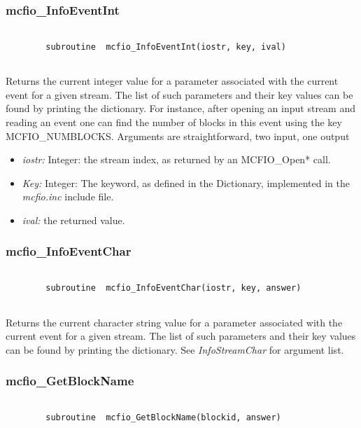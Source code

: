 \subsubsection{mcfio\_InfoEventInt}

\begin{verbatim}

        subroutine  mcfio_InfoEventInt(iostr, key, ival)
    
\end{verbatim}

Returns the current integer value for a parameter associated with the current
event for a given  stream. The list of such parameters and their key values 
can be found by printing the dictionary. For instance, after opening an input
stream and reading an event one can find the number of blocks in this 
 event  using the key
MCFIO\_NUMBLOCKS. Arguments are straightforward, two input, one output

\begin{itemize}
\item {\em iostr:} Integer: the stream index, as returned by an MCFIO\_Open* 
call.
\item {\em Key:} Integer: The keyword, as defined in the Dictionary, 
implemented in the {\em mcfio.inc} include file. 
\item {\em ival:} the  returned value.
\end{itemize}

 
\subsubsection{mcfio\_InfoEventChar}

\begin{verbatim}

        subroutine  mcfio_InfoEventChar(iostr, key, answer)
    
\end{verbatim}

Returns the current character string value for a parameter 
associated with the current event for a 
given stream. The list of such parameters and their key values 
can be found by printing the dictionary. See {\em InfoStreamChar} for
argument list. 

	
\subsubsection{mcfio\_GetBlockName}

\begin{verbatim}

        subroutine  mcfio_GetBlockName(blockid, answer)
    
\end{verbatim}

